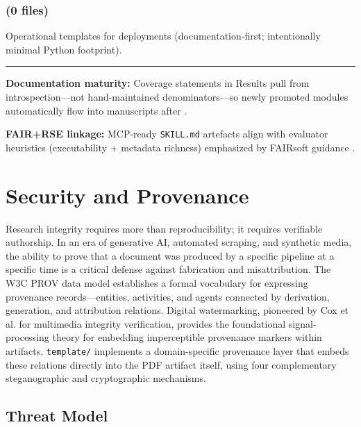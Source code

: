 \documentclass[
]{article}
\begin{document}
\subsubsection{\texorpdfstring{ (0
files)}{infrastructure/logrotate.d (0 files)}}\label{infrastructurelogrotate.d-0-files}

Operational templates for deployments (documentation-first;
intentionally minimal Python footprint).

\begin{center}\rule{0.5\linewidth}{0.5pt}\end{center}

\textbf{Documentation maturity:} Coverage statements in Results pull
from introspection---not hand-maintained denominators---so newly
promoted modules automatically flow into manuscripts after
.

\textbf{FAIR+RSE linkage:} MCP-ready \texttt{SKILL.md} artefacts align
with evaluator heuristics (executability + metadata richness) emphasized
by FAIRsoft guidance \citep{garijo2024fairsoft}.

\newpage

\section{Security and Provenance}\label{security-and-provenance}

Research integrity requires more than reproducibility; it requires
verifiable authorship. In an era of generative AI, automated scraping,
and synthetic media, the ability to prove that a document was produced
by a specific pipeline at a specific time is a critical defense against
fabrication and misattribution. The W3C PROV data model
\citep{moreau2013provdm} establishes a formal vocabulary for expressing
provenance records---entities, activities, and agents connected by
derivation, generation, and attribution relations. Digital watermarking,
pioneered by Cox et al. \citep{cox1997secure} for multimedia integrity
verification, provides the foundational signal-processing theory for
embedding imperceptible provenance markers within artifacts.
\texttt{template/} implements a domain-specific provenance layer that
embeds these relations directly into the PDF artifact itself, using four
complementary steganographic and cryptographic mechanisms.

\subsection{Threat Model}\label{threat-model}
\end{document}

